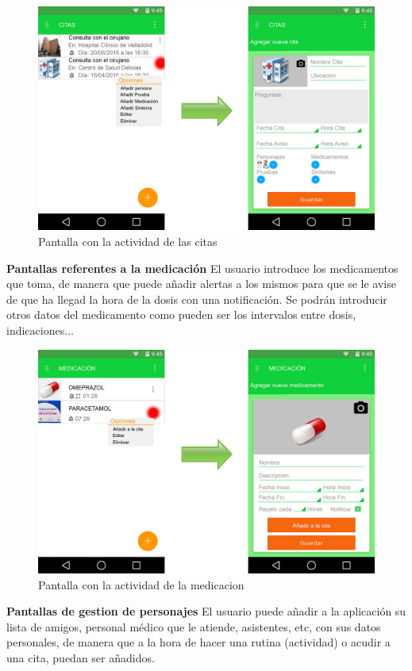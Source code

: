 \documentclass[../pfc.tex]{subfiles}
\begin{document}
			\begin{figure}
				\centering
				\includegraphics[width=0.7\linewidth]{../images/citas}
				\caption{Pantalla con la actividad de las citas}
				\label{fig:citas}
			\end{figure}
			
			
			\textbf{Pantallas referentes a la medicación}
			El usuario introduce los medicamentos que toma, de manera que puede añadir alertas a los mismos para que se le avise de que ha llegad la hora de la dosis con una notificación.
			Se podrán introducir otros datos del medicamento como pueden ser los intervalos entre dosis, indicaciones...
			
			\begin{figure}
				\centering
				\includegraphics[width=0.7\linewidth]{../images/medicacion}
				\caption{Pantalla con la actividad de la medicacion}
				\label{fig:medicacion}
			\end{figure}
			
			
			\textbf{Pantallas de gestion de personajes}
			El usuario puede añadir a la aplicación su lista de amigos, personal médico que le atiende, asistentes, etc, con sus datos personales, de manera que a la hora de hacer una rutina (actividad) o acudir a una cita, puedan ser añadidos.
			
\end{document}

